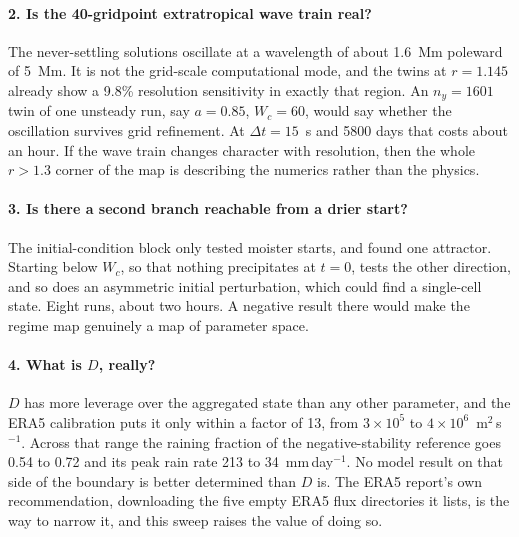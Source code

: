 \documentclass[11pt]{article}
\newcommand{\mmday}{mm\,day$^{-1}$}
\begin{document}
\paragraph{2. Is the 40-gridpoint extratropical wave train real?} The
never-settling solutions oscillate at a wavelength of about 1.6~Mm poleward of
5~Mm. It is not the grid-scale computational mode, and the twins at $r = 1.145$
already show a 9.8\% resolution sensitivity in exactly that region. An
$n_y = 1601$ twin of one unsteady run, say $a = 0.85$, $W_c = 60$, would say
whether the oscillation survives grid refinement. At $\Delta t = 15$~s and 5800
days that costs about an hour. If the wave train changes character with
resolution, then the whole $r > 1.3$ corner of the map is describing the numerics
rather than the physics.

\paragraph{3. Is there a second branch reachable from a drier start?} The
initial-condition block only tested moister starts, and found one attractor.
Starting below $W_c$, so that nothing precipitates at $t = 0$, tests the other
direction, and so does an asymmetric initial perturbation, which could find a
single-cell state. Eight runs, about two hours. A negative result there would
make the regime map genuinely a map of parameter space.

\paragraph{4. What is $D$, really?} $D$ has more leverage over the aggregated
state than any other parameter, and the ERA5 calibration puts it only within a
factor of 13, from $3\times10^{5}$ to $4\times10^{6}$~m$^2$\,s$^{-1}$. Across that
range the raining fraction of the negative-stability reference goes 0.54 to 0.72
and its peak rain rate 213 to 34~\mmday. No model result on that side of the
boundary is better determined than $D$ is. The ERA5 report's own recommendation,
downloading the five empty ERA5 flux directories it lists, is the way to narrow
it, and this sweep raises the value of doing so.
\end{document}
